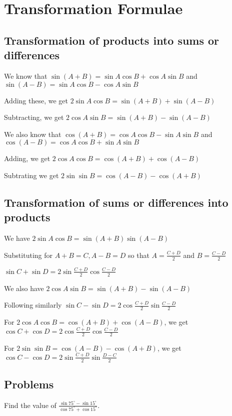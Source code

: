 \chapter{Transformation Formulae}
\section{Transformation of products into sums or differences}
We know that $\sin(A + B) = \sin A\cos B + \cos A\sin B$ and $\sin(A - B) = \sin A\cos B - \cos A\sin B$

\noindent Adding these, we get $2\sin A\cos B = \sin(A + B) + \sin(A - B)$

\noindent Subtracting, we get $2\cos A\sin B = \sin(A + B) - \sin (A - B)$

\noindent We also know that $\cos (A + B) = \cos A\cos B - \sin A\sin B$ and $\cos(A - B) = \cos A\cos B + \sin A\sin B$

\noindent Adding, we get $2\cos A\cos B = \cos (A + B) + \cos(A - B)$

\noindent Subtrating we get $2\sin \sin B = \cos (A - B) - \cos(A + B)$

\section{Transformation of sums or differences into products}
We have $2\sin A\cos B = \sin(A + B)\sin(A - B)$

\noindent Substituting for $A + B = C, A - B = D$ so that $A = \frac{C + D}{2}$ and $B = \frac{C- D}{2}$

\noindent $\sin C + \sin D = 2\sin \frac{C + D}{2}\cos \frac{C - D}{2}$

\noindent We also have $2\cos A\sin B = \sin(A + B) - \sin (A - B)$

\noindent Following similarly $\sin C - \sin D = 2\cos \frac{C + D}{2}\sin \frac{C - D}{2}$

\noindent For $2\cos A\cos B = \cos (A + B) + \cos(A - B)$, we get $\cos C + \cos D = 2\cos \frac{C + D}{2}\cos \frac{C - D}{2}$

\noindent For $2\sin \sin B = \cos (A - B) - \cos(A + B)$, we get $\cos C - \cos D = 2\sin \frac{C + D}{2}\sin \frac{D - C}{2}$

\section{Problems}
\startitemize[n, 1*broad]
\item Find the value of $\frac{\sin 75^\circ - \sin 15^\circ}{\cos 75^\circ + \cos 15^\circ}$.

